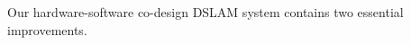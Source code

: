 \label{sec:hardsoft}
Our hardware-software co-design DSLAM system contains two essential improvements.